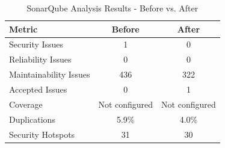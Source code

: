 \documentclass[12pt,a4paper]{article}
\begin{document}
\begin{table}[H]
\centering
\begin{tabular}{lcc}
\toprule
\textbf{Metric} & \textbf{Before} & \textbf{After} \\ 
\midrule
Security Issues & 1 & 0 \\ 
Reliability Issues & 0 & 0 \\ 
Maintainability Issues & 436 & 322 \\ 
Accepted Issues & 0 & 1 \\ 
Coverage & Not configured & Not configured \\ 
Duplications & 5.9\% & 4.0\% \\ 
Security Hotspots & 31 & 30 \\ 
\bottomrule
\end{tabular}
\caption{SonarQube Analysis Results - Before vs. After}
\end{table}
\end{document}
